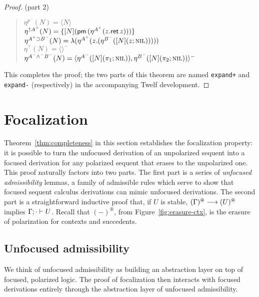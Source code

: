 \documentclass[acmtocl]{robtrans}\pdfoutput=1
\newcommand{\seq}[2]{{#1} \longrightarrow {#2} \mathstrut}
\newcommand{\susp}[1]{\langle{#1}\rangle}
\newcommand{\ifoc}[3]{{#1}; {#2} \vdash {#3} \mathstrut}
\newcommand{\etart}[1]{\langle{#1}\rangle} \newcommand{\etalt}[2]{\susp{#1}.{#2}}
\newcommand{\rft}[1]{\mathsf{ret}\,{#1}} \newcommand{\lft}[2]{{#1} \circ {#2}}
\begin{document}
\begin{proof}
\medskip
\clearpage{} (part 2) 
\begin{quote}
$\eta^{p^-}(N) = \etart{N}$\\
$\eta^{{\uparrow}A^+}(N) = \usrt{[N](\uslt{(\eta^{A^+}(z.\rft{z}))})}$\\
$\eta^{A^+ \supset B^-}(N)
  = \lambda(\eta^{A^+}(z. (\eta^{B^-}([N](z; \textsc{nil})))))$\\
$\eta^\top(N) = \langle\rangle^-$\\
$\eta^{A^- \wedge^- B^-}(N) 
  = \langle \eta^{A^-}([N](\pi_1;\textsc{nil})), 
            \eta^{B^-}([N](\pi_2;\textsc{nil}))\rangle^-$
\end{quote}


\noindent
This completes the proof; the two parts of this theorem are named
{\tt expand+} and {\tt expand-} (respectively) 
in the accompanying Twelf development.
\end{proof}

\section{Focalization}
\label{sec:focalization}

Theorem~\ref{thm:completeness} in this section establishes the
focalization property: it is possible to turn the 
unfocused derivation of an unpolarized sequent into a focused derivation
for any polarized sequent that erases to the unpolarized one. This
proof naturally factors into two parts. The first part is a series of
{\it unfocused admissibility} lemmas, a family of admissible rules
which serve to show that focused sequent calculus derivations can
mimic unfocused derivations.  The second part is a straightforward
inductive proof that, if $U$ is stable,
$\seq{(\Gamma)^\circledast}{(U)^\circledast}$ implies
$\ifoc{\Gamma}{\cdot}{U}$. Recall that $(-)^\circledast$, from
Figure~\ref{fig:erasure-ctx}, is the erasure of polarization for
contexts and succedents.


\subsection{Unfocused admissibility}\label{sec:unfocusedadmissibility}

We think of unfocused admissibility as building an
abstraction layer on top of focused, polarized logic.  The proof of
focalization then interacts with focused derivations entirely through
the abstraction layer of unfocused admissibility. 
\end{document}
